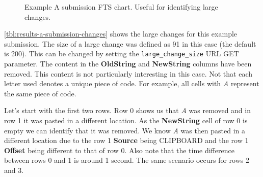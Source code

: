 \begin{figure}[H]
  \centering
  \caption[Submission Results A Chart]{Example A submission FTS chart. Useful for identifying large changes.}
  \label{fig:results-a-submission-chart}
\end{figure}

\newpage

\autoref{tbl:results-a-submission-changes} shows the large changes for this example submission. The size of a large change was defined as 91 in this case (the default is 200). This can be changed by setting the \texttt{large\_change\_size} URL GET parameter. The content in the \textbf{OldString} and \textbf{NewString} columns have been removed. This content is not particularly interesting in this case. Not that each letter used denotes a unique piece of code. For example, all cells with \textit{A} represent the same piece of code.

Let's start with the first two rows. Row 0 shows us that \textit{A} was removed and in row 1 it was pasted in a different location. As the \textbf{NewString} cell of row 0 is empty we can identify that it was removed. We know \textit{A} was then pasted in a different location due to the row 1 \textbf{Source} being CLIPBOARD and the row 1 \textbf{Offset} being different to that of row 0. Also note that the time difference between rows 0 and 1 is around 1 second. The same scenario occurs for rows 2 and 3.


